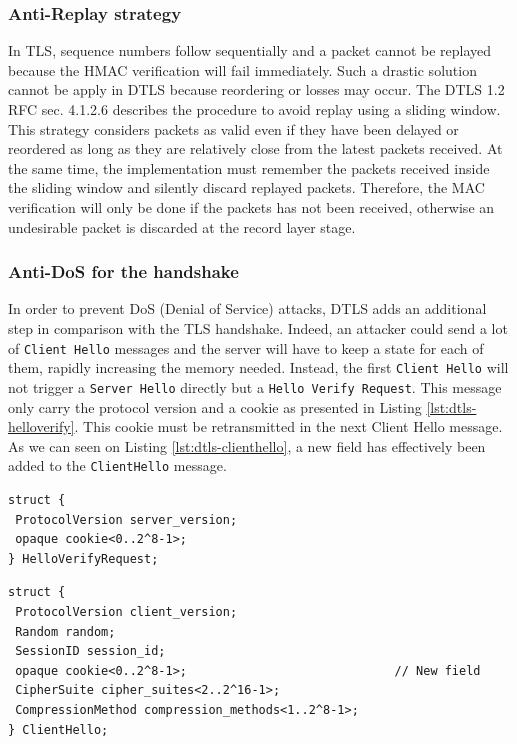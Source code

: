 \subsubsection{Anti-Replay strategy}

In TLS, sequence numbers follow sequentially and a packet cannot be replayed because the HMAC verification will fail immediately. Such a drastic solution cannot be apply in DTLS because reordering or losses may occur. The DTLS 1.2 RFC \cite{rfc6347} sec. 4.1.2.6 describes the procedure to avoid replay using a sliding window. This strategy considers packets as valid even if they have been delayed or reordered as long as they are relatively close from the latest packets received. At the same time, the implementation must remember the packets received inside the sliding window and silently discard replayed packets. Therefore, the MAC verification will only be done if the packets has not been received, otherwise an undesirable packet is discarded at the record layer stage.


\subsubsection{Anti-DoS for the handshake}

In order to prevent DoS (Denial of Service) attacks, DTLS adds an additional step in comparison with the TLS handshake. Indeed, an attacker could send a lot of \texttt{Client Hello} messages and the server will have to keep a state for each of them, rapidly increasing the memory needed. Instead, the first \texttt{Client Hello} will not trigger a \texttt{Server Hello} directly but a \texttt{Hello Verify Request}. This message only carry the protocol version and a cookie as presented in Listing \ref{lst:dtls-helloverify}. This cookie must be retransmitted in the next Client Hello message. As we can seen on Listing \ref{lst:dtls-clienthello}, a new field has effectively been added to the \texttt{ClientHello} message.

\begin{lstlisting}[caption=DTLS HelloVerifyRequest message, label=lst:dtls-helloverify]
struct {
 ProtocolVersion server_version;
 opaque cookie<0..2^8-1>;
} HelloVerifyRequest;
\end{lstlisting}


\begin{lstlisting}[caption=DTLS ClientHello adapted message, label=lst:dtls-clienthello]
struct {
 ProtocolVersion client_version;
 Random random;
 SessionID session_id;
 opaque cookie<0..2^8-1>;                             // New field
 CipherSuite cipher_suites<2..2^16-1>;
 CompressionMethod compression_methods<1..2^8-1>;
} ClientHello;
\end{lstlisting}

